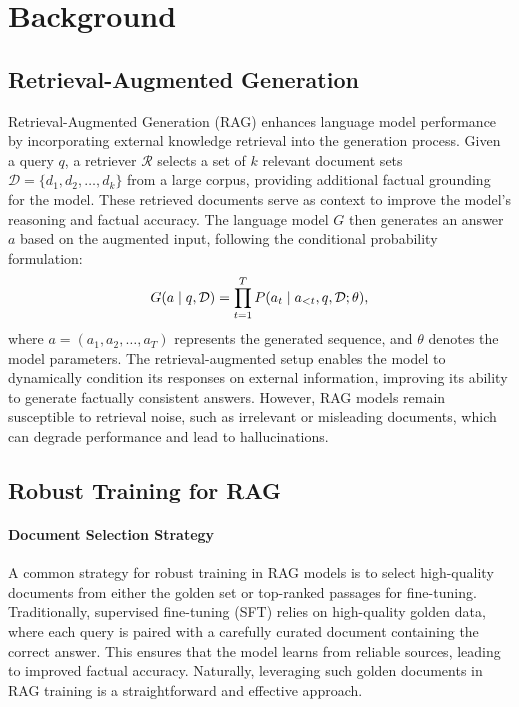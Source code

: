 \section{Background}
\subsection{Retrieval-Augmented Generation}
Retrieval-Augmented Generation (RAG) enhances language model performance by incorporating external knowledge retrieval into the generation process. Given a query $q$, a retriever $\mathcal{R}$ selects a set of $k$ relevant document sets $\mathcal{D} = \{d_1, d_2, \dots, d_k\}$ from a large corpus, providing additional factual grounding for the model. These retrieved documents serve as context to improve the model’s reasoning and factual accuracy. The language model $G$ then generates an answer $a$ based on the augmented input, following the conditional probability formulation:  
\begin{equation}
\textstyle
\setlength\abovedisplayskip{0.2cm}
\setlength\belowdisplayskip{0.2cm}
\begin{aligned}
G(a \mid q, \mathcal{D}) = \prod_{t=1}^{T} P(a_t \mid a_{<t}, q, \mathcal{D}; \theta),
\end{aligned}
\end{equation}  
where $a = (a_1, a_2, \dots, a_T)$ represents the generated sequence, and $\theta$ denotes the model parameters. The retrieval-augmented setup enables the model to dynamically condition its responses on external information, improving its ability to generate factually consistent answers. However, RAG models remain susceptible to retrieval noise, such as irrelevant or misleading documents, which can degrade performance and lead to hallucinations.  

\subsection{Robust Training for RAG}
\paragraph{Document Selection Strategy}
A common strategy for robust training in RAG models is to select high-quality documents from either the golden set or top-ranked passages for fine-tuning. Traditionally, supervised fine-tuning (SFT) relies on high-quality golden data, where each query is paired with a carefully curated document containing the correct answer. This ensures that the model learns from reliable sources, leading to improved factual accuracy. Naturally, leveraging such golden documents in RAG training is a straightforward and effective approach.

